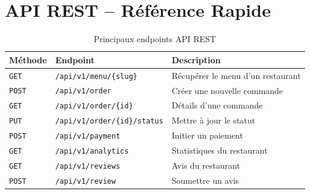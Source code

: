 \documentclass[12pt,a4paper]{report}
\begin{document}
\chapter{API REST -- Référence Rapide}

\begin{table}[H]
    \centering
    \begin{tabularx}{\textwidth}{l l X}
        \toprule
        \rowcolor{primary!10}
        \textbf{Méthode} & \textbf{Endpoint} & \textbf{Description} \\
        \midrule
        \texttt{GET} & \texttt{/api/v1/menu/\{slug\}} & Récupérer le menu d'un restaurant \\
        \texttt{POST} & \texttt{/api/v1/order} & Créer une nouvelle commande \\
        \texttt{GET} & \texttt{/api/v1/order/\{id\}} & Détails d'une commande \\
        \texttt{PUT} & \texttt{/api/v1/order/\{id\}/status} & Mettre à jour le statut \\
        \texttt{POST} & \texttt{/api/v1/payment} & Initier un paiement \\
        \texttt{GET} & \texttt{/api/v1/analytics} & Statistiques du restaurant \\
        \texttt{GET} & \texttt{/api/v1/reviews} & Avis du restaurant \\
        \texttt{POST} & \texttt{/api/v1/review} & Soumettre un avis \\
        \bottomrule
    \end{tabularx}
    \caption{Principaux endpoints API REST}
    \label{tab:api}
\end{table}
\end{document}
